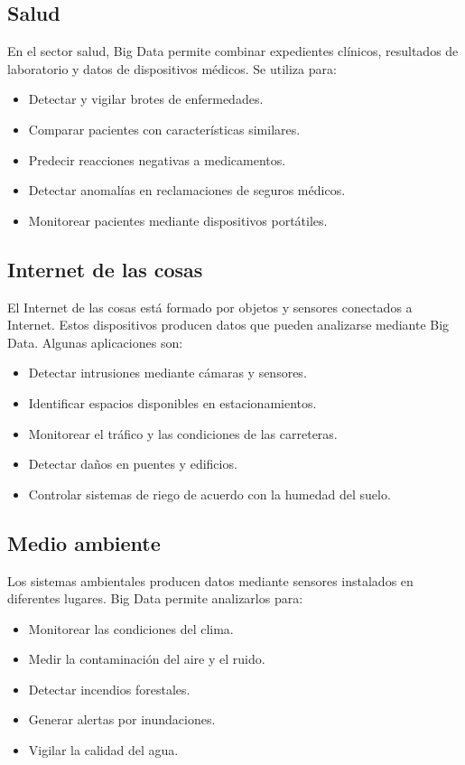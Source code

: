 \subsection{Salud}

En el sector salud, Big Data permite combinar expedientes clínicos, resultados de laboratorio y datos de dispositivos médicos. Se utiliza para:

\begin{itemize}
    \item Detectar y vigilar brotes de enfermedades.
    \item Comparar pacientes con características similares.
    \item Predecir reacciones negativas a medicamentos.
    \item Detectar anomalías en reclamaciones de seguros médicos.
    \item Monitorear pacientes mediante dispositivos portátiles.
\end{itemize}

\subsection{Internet de las cosas}

El Internet de las cosas está formado por objetos y sensores conectados a Internet. Estos dispositivos producen datos que pueden analizarse mediante Big Data. Algunas aplicaciones son:

\begin{itemize}
    \item Detectar intrusiones mediante cámaras y sensores.
    \item Identificar espacios disponibles en estacionamientos.
    \item Monitorear el tráfico y las condiciones de las carreteras.
    \item Detectar daños en puentes y edificios.
    \item Controlar sistemas de riego de acuerdo con la humedad del suelo.
\end{itemize}

\subsection{Medio ambiente}

Los sistemas ambientales producen datos mediante sensores instalados en diferentes lugares. Big Data permite analizarlos para:

\begin{itemize}
    \item Monitorear las condiciones del clima.
    \item Medir la contaminación del aire y el ruido.
    \item Detectar incendios forestales.
    \item Generar alertas por inundaciones.
    \item Vigilar la calidad del agua.
\end{itemize}

